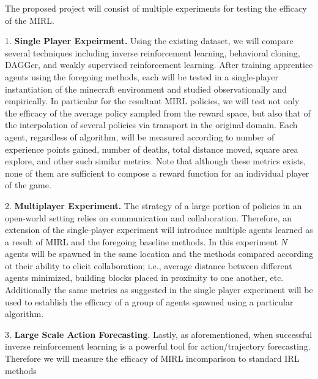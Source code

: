\documentclass[11pt]{article}
\begin{document}
The proposed project will consist of multiple experiments for testing the efficacy of the MIRL. 

1. \textbf{Single Player Expeirment.} Using the existing dataset, we will compare several techniques including inverse reinforcement learning, behavioral cloning, DAGGer, and weakly supervised reinforcement learning. After training apprentice agents using the foregoing methods, each will be tested in a single-player instantiation of the minecraft environment and studied observationally and empirically. In particular for the resultant MIRL policies, we will test not only the efficacy of the average policy sampled from the reward space, but also that of the interpolation of several policies via transport in the original domain. Each agent, regardless of algorithm, will be measured according to number of experience points gained, number of deaths, total distance moved, square area explore, and other such similar metrics. Note that although these metrics exists, none of them are sufficient to compose a reward function for an individual player of the game.

2.\textbf{ Multiplayer Experiment.} The strategy of a large portion of policies in an open-world setting relies on communication and collaboration. Therefore, an extension of the single-player experiment will introduce multiple agents learned as a result of MIRL and the foregoing baseline methods. In this experiment $N$ agents will be spawned in the same location and the methods compared according ot their ability to elicit collaboration; i.e., average distance between different agents minimized, building blocks placed in proximity to one another, etc. Additionally the same metrics as suggested in the single player experiment will be used to establish the efficacy of a group of agents spawned using a particular algorithm.

3. \textbf{Large Scale Action Forecasting}. Lastly, as aforementioned, when successful inverse reinforcement learning is a powerful tool for action/trajectory forecasting. Therefore we will measure the efficacy of MIRL incomparison to standard IRL methods  







\end{document}
